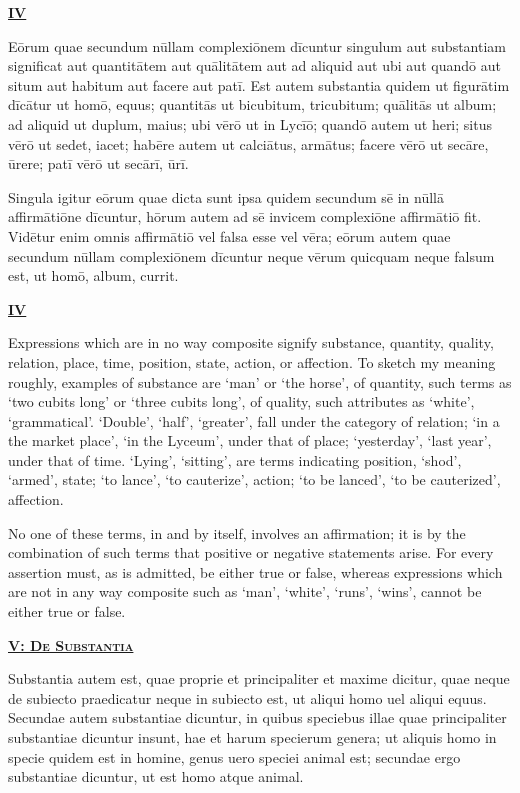 \documentclass[14pt,twoside]{extbook}
\newcommand{\mktitle}[1]{%
    {\begin{center}\small\textsc{\bfseries\underline{#1}}\end{center}}}
\begin{document}
\mktitle{IV}

Eōrum quae secundum nūllam complexiōnem dīcuntur singulum aut
substantiam significat aut quantitātem aut quālitātem aut ad aliquid
aut ubi aut quandō aut situm aut habitum aut facere aut patī. Est
autem substantia quidem ut figurātim dīcātur ut homō, equus; quantitās
ut bicubitum, tricubitum; quālitās ut album; ad aliquid ut duplum,
maius; ubi vērō ut in Lycīō; quandō autem ut heri; situs vērō ut
sedet, iacet; habēre autem ut calciātus, armātus; facere vērō ut
secāre, ūrere; patī vērō ut secārī, ūrī.

Singula igitur eōrum quae
dicta sunt ipsa quidem secundum sē in nūllā affirmātiōne dīcuntur,
hōrum autem ad sē invicem complexiōne affirmātiō fit. Vidētur enim
omnis affirmātiō vel falsa esse vel vēra; eōrum autem quae secundum
nūllam complexiōnem dīcuntur neque vērum quicquam neque falsum est, ut
homō, album, currit.\newpage

\mktitle{IV}

Expressions which are in no way composite signify substance, quantity, quality, relation, place, time, position, state, action, or affection. To sketch my meaning roughly, examples of substance are `man' or `the horse', of quantity, such terms as `two cubits long' or `three cubits long', of quality, such attributes as `white', `grammatical'. `Double', `half', `greater', fall under the category of relation; `in a the market place', `in the Lyceum', under that of place; `yesterday', `last year', under that of time. `Lying', `sitting', are terms indicating position, `shod', `armed', state; `to lance', `to cauterize', action; `to be lanced', `to be cauterized', affection.

No one of these terms, in and by itself, involves an affirmation; it is by the combination of such terms that positive or negative statements arise. For every assertion must, as is admitted, be either true or false, whereas expressions which are not in any way composite such as `man', `white', `runs', `wins', cannot be either true or false.\newpage

\mktitle{V: De Substantia}

Substantia autem est, quae proprie et principaliter et maxime dicitur,
quae neque de subiecto praedicatur neque in subiecto est, ut aliqui
homo uel aliqui equus. Secundae autem substantiae dicuntur, in quibus
speciebus illae quae principaliter substantiae dicuntur insunt, hae et
harum specierum genera; ut aliquis homo in specie quidem est in
homine, genus uero speciei animal est; secundae ergo substantiae
dicuntur, ut est homo atque animal.
\end{document}
